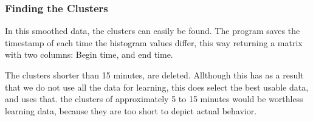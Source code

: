 \subsubsection{Finding the Clusters}
In this smoothed data, the clusters can easily be found. The program saves the
timestamp of each time the histogram values differ, this way returning a matrix
with two columns: Begin time, and end time. 

The clusters shorter than 15 minutes, are deleted. Allthough
this has as a result that we do not use all the data for learning, this does
select the best usable data, and uses that. the clusters of approximately 5 to
15 minutes would be worthless learning data, because they are too short to
depict actual behavior.

